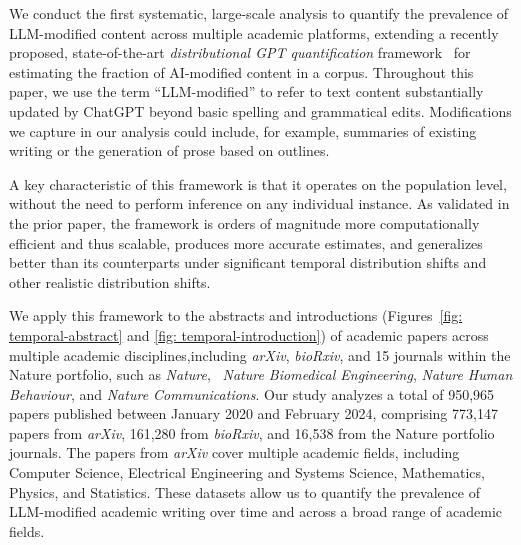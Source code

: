 \documentclass{article}
\begin{document}
We conduct the first systematic, large-scale analysis to quantify the prevalence of LLM-modified content across multiple academic platforms, extending a recently proposed, state-of-the-art \textit{distributional GPT quantification} framework~\citep{liang2024monitoring} for estimating the fraction of AI-modified content in a corpus. Throughout this paper, we use the term ``LLM-modified'' to refer to text content substantially updated by ChatGPT beyond basic spelling and grammatical edits. Modifications we capture in our analysis could include, for example, summaries of existing writing or the generation of prose based on outlines.


A key characteristic of this framework is that it operates on the population level, without the need to perform inference on any individual instance. As validated in the prior paper, the framework is orders of magnitude more computationally efficient and thus scalable, produces more accurate estimates, and generalizes better than its counterparts under significant temporal distribution shifts and other realistic distribution shifts. 

We apply this framework to the abstracts and introductions (Figures~\ref{fig: temporal-abstract} and \ref{fig: temporal-introduction}) of academic papers across multiple academic disciplines,including \textit{arXiv}, \textit{bioRxiv}, and 15 journals within the Nature portfolio, such as \textit{Nature}, \
\textit{Nature Biomedical Engineering}, \textit{Nature Human Behaviour}, and \textit{Nature Communications}. Our study analyzes a total of 950,965 papers published between January 2020 and February 2024, comprising 773,147 papers from \textit{arXiv}, 161,280 from \textit{bioRxiv}, and 16,538 from the Nature portfolio journals. The papers from \textit{arXiv} cover multiple academic fields, including Computer Science, Electrical Engineering and Systems Science, Mathematics, Physics, and Statistics. These datasets allow us to quantify the prevalence of LLM-modified academic writing over time and across a broad range of academic fields. 
\end{document}
